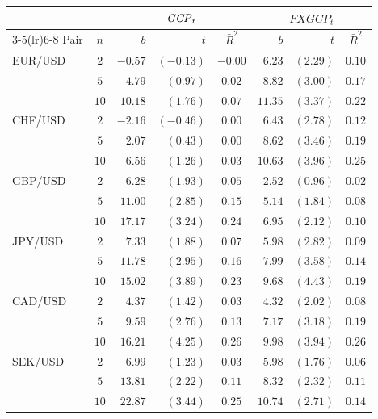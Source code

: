 \small
\begin{tabular}{l c rrc rrc}
  \toprule
  & & \multicolumn{3}{c}{$\mathit{GCP}_{t}$} & \multicolumn{3}{c}{$\mathit{FXGCP}_{t}$} \\
  \cmidrule(lr){3-5}\cmidrule(lr){6-8}
  Pair & $n$ & $b$ & $t$ & $\bar{R}^{2}$ & $b$ & $t$ & $\bar{R}^{2}$ \\
  \midrule
  EUR/USD & $2$  & $-0.57$ & $(-0.13)$ & $-0.00$ & $6.23$  & $(2.29)$ & $0.10$ \\
          & $5$  & $4.79$  & $(0.97)$  & $0.02$  & $8.82$  & $(3.00)$ & $0.17$ \\
          & $10$ & $10.18$ & $(1.76)$  & $0.07$  & $11.35$ & $(3.37)$ & $0.22$ \\
  \addlinespace
  CHF/USD & $2$  & $-2.16$ & $(-0.46)$ & $0.00$  & $6.43$  & $(2.78)$ & $0.12$ \\
          & $5$  & $2.07$  & $(0.43)$  & $0.00$  & $8.62$  & $(3.46)$ & $0.19$ \\
          & $10$ & $6.56$  & $(1.26)$  & $0.03$  & $10.63$ & $(3.96)$ & $0.25$ \\
  \addlinespace
  GBP/USD & $2$  & $6.28$  & $(1.93)$  & $0.05$  & $2.52$  & $(0.96)$ & $0.02$ \\
          & $5$  & $11.00$ & $(2.85)$  & $0.15$  & $5.14$  & $(1.84)$ & $0.08$ \\
          & $10$ & $17.17$ & $(3.24)$  & $0.24$  & $6.95$  & $(2.12)$ & $0.10$ \\
  \addlinespace
  JPY/USD & $2$  & $7.33$  & $(1.88)$  & $0.07$  & $5.98$  & $(2.82)$ & $0.09$ \\
          & $5$  & $11.78$ & $(2.95)$  & $0.16$  & $7.99$  & $(3.58)$ & $0.14$ \\
          & $10$ & $15.02$ & $(3.89)$  & $0.23$  & $9.68$  & $(4.43)$ & $0.19$ \\
  \addlinespace
  CAD/USD & $2$  & $4.37$  & $(1.42)$  & $0.03$  & $4.32$  & $(2.02)$ & $0.08$ \\
          & $5$  & $9.59$  & $(2.76)$  & $0.13$  & $7.17$  & $(3.18)$ & $0.19$ \\
          & $10$ & $16.21$ & $(4.25)$  & $0.26$  & $9.98$  & $(3.94)$ & $0.26$ \\
  \addlinespace
  SEK/USD & $2$  & $6.99$  & $(1.23)$  & $0.03$  & $5.98$  & $(1.76)$ & $0.06$ \\
          & $5$  & $13.81$ & $(2.22)$  & $0.11$  & $8.32$  & $(2.32)$ & $0.11$ \\
          & $10$ & $22.87$ & $(3.44)$  & $0.25$  & $10.74$ & $(2.71)$ & $0.14$ \\
  \bottomrule
\end{tabular}
